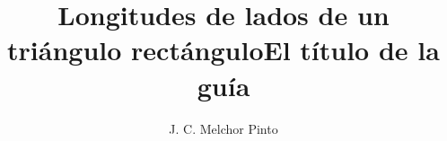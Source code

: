 \documentclass[12pt,addpoints,answers]{guia}
\title{Longitudes de lados de un triángulo rectángulo}
\title{El título de la guía}
\author{J. C. Melchor Pinto}
\begin{document}
\pagestyle{headandfoot}

\INFO
\begin{multicols}{2}
    
    
    \columnbreak
    
\end{multicols}
\begin{questions}
    \questionboxed[10]{}
    \questionboxed[10]{}
    \questionboxed[10]{}
    \questionboxed[10]{}
    \questionboxed[10]{}
    \questionboxed[10]{}
    \questionboxed[10]{}
    \questionboxed[10]{}
    \questionboxed[10]{}
    \questionboxed[10]{}
\end{questions}
\end{document}
